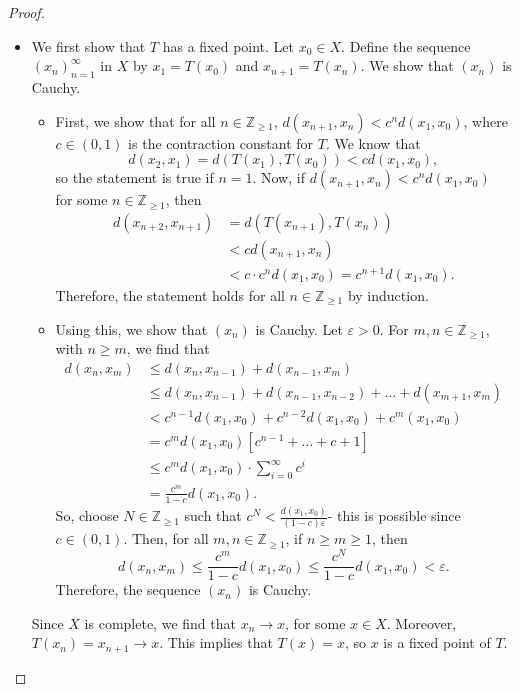 \documentclass[a4paper, openany]{memoir}
\theoremstyle{definition}
\theoremstyle{plain}
\begin{document}
\begin{proof}
\hspace*{0pt}
\begin{itemize}
    \item We first show that $T$ has a fixed point. Let $x_0 \in X$. Define the sequence $(x_n)_{n=1}^{\infty}$ in $X$ by $x_1 = T(x_0)$ and $x_{n+1} = T(x_n)$. We show that $(x_n)$ is Cauchy.
    \begin{itemize}
        \item First, we show that for all $n \in \mathbb{Z}_{\geqslant 1}$, $d(x_{n+1}, x_n) < c^n d(x_1, x_0)$, where $c \in (0, 1)$ is the contraction constant for $T$. We know that 
        \[d(x_2, x_1) = d(T(x_1), T(x_0)) < cd(x_1, x_0),\]
        so the statement is true if $n = 1$. Now, if $d(x_{n+1}, x_n) < c^n d(x_1, x_0)$ for some $n \in \mathbb{Z}_{\geqslant 1}$, then
        \begin{align*}
            d(x_{n+2}, x_{n+1}) &= d(T(x_{n+1}), T(x_n)) \\
            &< cd(x_{n+1}, x_n) \\
            &< c \cdot c^n d(x_1, x_0) = c^{n+1} d(x_1, x_0).
        \end{align*}
        Therefore, the statement holds for all $n \in \mathbb{Z}_{\geqslant 1}$ by induction.
        
        \item Using this, we show that $(x_n)$ is Cauchy. Let $\varepsilon > 0$. For $m, n \in \mathbb{Z}_{\geqslant 1}$, with $n \geqslant m$, we find that
        \begin{align*}
            d(x_n, x_m) &\leqslant d(x_n, x_{n-1}) + d(x_{n-1}, x_m) \\
            &\leqslant d(x_n, x_{n-1}) + d(x_{n-1}, x_{n-2}) + \dots + d(x_{m+1}, x_m) \\
            &< c^{n-1} d(x_1, x_0) + c^{n-2} d(x_1, x_0) + c^m (x_1, x_0) \\
            &= c^m d(x_1, x_0) [c^{n-1} + \dots + c + 1] \\
            &\leqslant c^m d(x_1, x_0) \cdot \sum_{i=0}^\infty c^i \\
            &= \frac{c^m}{1 - c} d(x_1, x_0).
        \end{align*}
        So, choose $N \in \mathbb{Z}_{\geqslant 1}$ such that $c^N < \frac{d(x_1, x_0)}{(1-c) \varepsilon}$- this is possible since $c \in (0, 1)$. Then, for all $m, n \in \mathbb{Z}_{\geqslant 1}$, if $n \geqslant m \geqslant 1$, then
        \[d(x_n, x_m) \leqslant \frac{c^m}{1 - c} d(x_1, x_0) \leqslant \frac{c^N}{1-c} d(x_1, x_0) < \varepsilon.\]
        Therefore, the sequence $(x_n)$ is Cauchy.
    \end{itemize}
    Since $X$ is complete, we find that $x_n \to x$, for some $x \in X$. Moreover, $T(x_n) = x_{n+1} \to x$. This implies that $T(x) = x$, so $x$ is a fixed point of $T$.
    

\end{itemize}
\end{proof}
\end{document}
